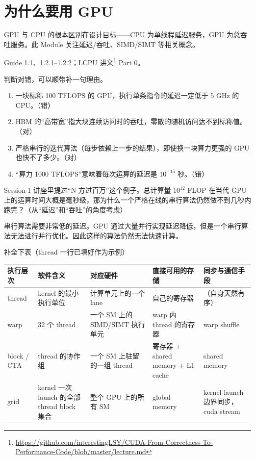 \documentclass[11pt,a4paper,fontset=none]{ctexart}
\begin{document}
\section{为什么要用 GPU}

GPU 与 CPU 的根本区别在设计目标——CPU 为单线程延迟服务，GPU 为总吞吐服务。此 Module 关注延迟/吞吐、SIMD/SIMT 等相关概念。

\begin{reading}
  Guide 1.1、1.2.1--1.2.2；LCPU 讲义\footnote{\url{https://github.com/interestingLSY/CUDA-From-Correctness-To-Performance-Code/blob/master/lecture.md}} Part 0。
\end{reading}

判断对错，可以顺带补一句理由。
\begin{enumerate}[label=(\alph*)]
  \item 一块标称 100 TFLOPS 的 GPU，执行单条指令的延迟一定低于 5 GHz 的 CPU。（错）
  \item HBM 的“高带宽”指大块连续访问时的吞吐，零散的随机访问达不到标称值。（对）
  \item 严格串行的迭代算法（每步依赖上一步的结果），即使换一块算力更强的 GPU 也快不了多少。（对）
  \item “算力 1000 TFLOPS”意味着每次运算的延迟是 $10^{-15}$ 秒。（错）
\end{enumerate}

Session 1 讲座里提过“N 方过百万”这个例子。总计算量 $10^{12}$ FLOP 在当代 GPU 上的运算时间大概是毫秒级，那为什么一个严格在线的串行算法仍然做不到几秒内跑完？（从“延迟”和“吞吐”的角度考虑）

串行算法需要非常低的延迟。GPU 通过大量并行实现延迟降低，但是一个串行算法无法进行并行优化。因此这样的算法仍然无法快速计算。

补全下表（thread 一行已填好作为示例）

\begin{center}\small
  \begin{tabular}{@{}L{5.2em}L{9em}L{7.5em}L{7.5em}L{8em}@{}}
    \toprule
    执行层次        & 软件含义                                 & 对应硬件                    & 直接可用的存储                        & 同步与通信手段                        \\
    \midrule
    thread      & kernel 的最小执行单位                       & 计算单元上的一个 lane           & 自己的寄存器                         & （自身天然有序）                       \\
    warp        & 32 个 thread                          & 一个 SM 上的 SIMD/SIMT 执行单元 & warp 内 thread 的寄存器             & warp shuffle                   \\
    block / CTA & thread 的协作组                          & 一个 SM 上驻留的一组 thread     & 寄存器 + shared memory + L1 cache & shared memory                  \\
    grid        & kernel 一次 launch 的全部 thread block 集合 & 整个 GPU 上的所有 SM          & global memory                  & kernel launch 边界同步，cuda stream \\
    \bottomrule
  \end{tabular}
\end{center}
\end{document}

